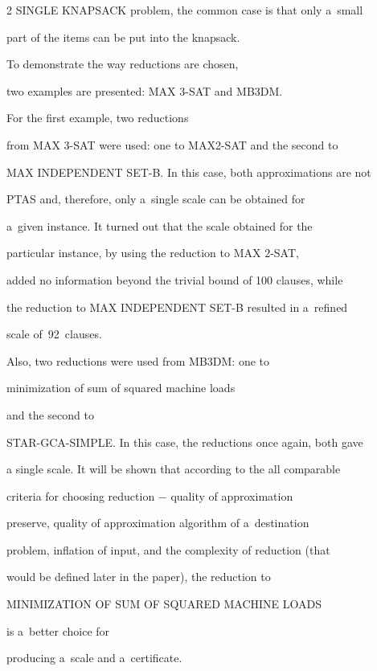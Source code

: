 \begin{multicols}{2}
{SINGLE KNAPSACK} problem, the common case is that only a~small


part of the items can be put into the knapsack.





To demonstrate the way reductions are chosen,


two examples are presented: {MAX 3-SAT} and {MB3DM}.





For the first example,  two reductions


from {MAX 3-SAT} were used: one to {MAX2-SAT} and the second to


{MAX INDEPENDENT SET-B}. In this case, both approximations are not


{PTAS} and, therefore, only a~single scale can be obtained for


a~given instance. It turned out that the scale obtained for the


particular instance, by using the reduction to {MAX 2-SAT},


added no information beyond the trivial bound of 100 clauses, while


the reduction to {MAX INDEPENDENT SET-B} resulted in a~refined


scale of~92~clauses.





Also, two reductions were used from {MB3DM}: one to {


minimization of sum of squared machine loads} and the second to


{STAR-GCA-SIMPLE}. In this case, the reductions once again, both gave


a single scale. It will be shown that according to the all comparable


criteria for choosing reduction $-$ quality of approximation


preserve, quality of approximation algorithm of a~destination


problem, inflation of input, and the complexity of reduction (that


would be defined later in the paper), the reduction to {


MINIMIZATION OF SUM OF SQUARED MACHINE LOADS} is a~better choice for


producing a~scale and a~certificate.








\end{multicols}
